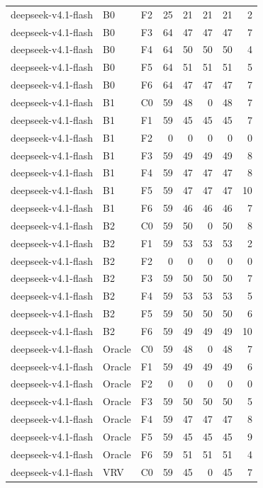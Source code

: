\begin{tabular}{lllrrrrr}
deepseek-v4.1-flash & B0 & F2 & 25 & 21 & 21 & 21 & 2 \\
deepseek-v4.1-flash & B0 & F3 & 64 & 47 & 47 & 47 & 7 \\
deepseek-v4.1-flash & B0 & F4 & 64 & 50 & 50 & 50 & 4 \\
deepseek-v4.1-flash & B0 & F5 & 64 & 51 & 51 & 51 & 5 \\
deepseek-v4.1-flash & B0 & F6 & 64 & 47 & 47 & 47 & 7 \\
deepseek-v4.1-flash & B1 & C0 & 59 & 48 & 0 & 48 & 7 \\
deepseek-v4.1-flash & B1 & F1 & 59 & 45 & 45 & 45 & 7 \\
deepseek-v4.1-flash & B1 & F2 & 0 & 0 & 0 & 0 & 0 \\
deepseek-v4.1-flash & B1 & F3 & 59 & 49 & 49 & 49 & 8 \\
deepseek-v4.1-flash & B1 & F4 & 59 & 47 & 47 & 47 & 8 \\
deepseek-v4.1-flash & B1 & F5 & 59 & 47 & 47 & 47 & 10 \\
deepseek-v4.1-flash & B1 & F6 & 59 & 46 & 46 & 46 & 7 \\
deepseek-v4.1-flash & B2 & C0 & 59 & 50 & 0 & 50 & 8 \\
deepseek-v4.1-flash & B2 & F1 & 59 & 53 & 53 & 53 & 2 \\
deepseek-v4.1-flash & B2 & F2 & 0 & 0 & 0 & 0 & 0 \\
deepseek-v4.1-flash & B2 & F3 & 59 & 50 & 50 & 50 & 7 \\
deepseek-v4.1-flash & B2 & F4 & 59 & 53 & 53 & 53 & 5 \\
deepseek-v4.1-flash & B2 & F5 & 59 & 50 & 50 & 50 & 6 \\
deepseek-v4.1-flash & B2 & F6 & 59 & 49 & 49 & 49 & 10 \\
deepseek-v4.1-flash & Oracle & C0 & 59 & 48 & 0 & 48 & 7 \\
deepseek-v4.1-flash & Oracle & F1 & 59 & 49 & 49 & 49 & 6 \\
deepseek-v4.1-flash & Oracle & F2 & 0 & 0 & 0 & 0 & 0 \\
deepseek-v4.1-flash & Oracle & F3 & 59 & 50 & 50 & 50 & 5 \\
deepseek-v4.1-flash & Oracle & F4 & 59 & 47 & 47 & 47 & 8 \\
deepseek-v4.1-flash & Oracle & F5 & 59 & 45 & 45 & 45 & 9 \\
deepseek-v4.1-flash & Oracle & F6 & 59 & 51 & 51 & 51 & 4 \\
deepseek-v4.1-flash & VRV & C0 & 59 & 45 & 0 & 45 & 7 \\

\end{tabular}
